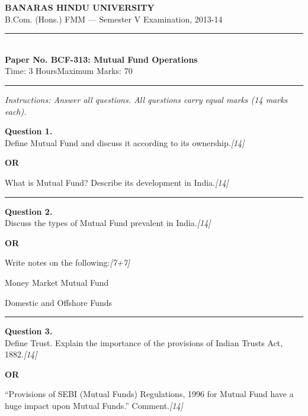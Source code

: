 \documentclass[11pt,a4paper]{article}
\newcommand{\pts}[1]{\hfill   \textit{[#1]}}
\begin{document}
\begin{center}
  {\large\bfseries BANARAS HINDU UNIVERSITY}\\[2pt]
  {\normalsize B.Com. (Hons.) FMM --- Semester V Examination, 2013-14}\\[6pt]
  \rule{0.8\linewidth}{0.5pt}\\[6pt]
  {\large\bfseries Paper No. BCF-313: Mutual Fund Operations}\\[4pt]
  {\normalsize Time: 3 Hours\hfill Maximum Marks: 70}
\end{center}

\rule{\linewidth}{0.4pt}

\smallskip



\noindent   \textit{Instructions: Answer all questions. All questions carry equal marks (14 marks each).}

\bigskip




\noindent   \textbf{Question 1.} \\
Define Mutual Fund and discuss it according to its ownership.\pts{14}

\centerline{   \textbf{OR}}

What is Mutual Fund? Describe its development in India.\pts{14}

\medskip\rule{\linewidth}{0.2pt}




\noindent   \textbf{Question 2.} \\
Discuss the types of Mutual Fund prevalent in India.\pts{14}

\centerline{   \textbf{OR}}

Write notes on the following:\pts{7+7}

\begin{parts}
  \item Money Market Mutual Fund
  \item Domestic and Offshore Funds
\end{parts}

\medskip\rule{\linewidth}{0.2pt}




\noindent   \textbf{Question 3.} \\
Define Trust. Explain the importance of the provisions of Indian Trusts Act, 1882.\pts{14}

\centerline{   \textbf{OR}}

``Provisions of SEBI (Mutual Funds) Regulations, 1996 for Mutual Fund have a huge impact upon Mutual Funds.'' Comment.\pts{14}
\end{document}
